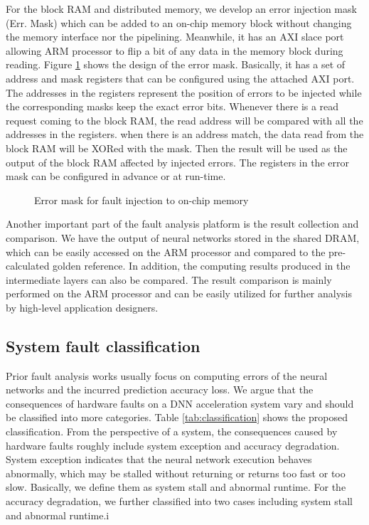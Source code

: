 For the block RAM and distributed memory, we develop an error injection 
mask (Err. Mask) which can be added to an on-chip memory block without 
changing the memory interface nor the pipelining. Meanwhile, it has an 
AXI slace port allowing ARM processor to flip a bit of any data in the 
memory block during reading. Figure \ref{fig:error-mask} shows the design 
of the error mask. Basically, it has a set of address and mask registers 
that can be configured using the attached AXI port. The addresses in 
the registers represent the position of errors to be injected while 
the corresponding masks keep the exact error bits. Whenever there is 
a read request coming to the block RAM, the read address will be compared 
with all the addresses in the registers. when there is an address match, 
the data read from the block RAM will be XORed with the mask.
Then the result will be used as the output of the block RAM 
affected by injected errors. The registers in the error mask 
can be configured in advance or at run-time. 

\begin{figure}
    \caption{Error mask for fault injection to on-chip memory}
\vspace{-0.5em}
\label{fig:error-mask}
\end{figure}

Another important part of the fault analysis platform is the result 
collection and comparison. We have the output of neural networks 
stored in the shared DRAM, which can be easily accessed on the ARM processor 
and compared to the pre-calculated golden reference. In addition, the computing 
results produced in the intermediate layers can also be compared.
The result comparison is mainly performed on the ARM processor and can be 
easily utilized for further analysis by high-level application designers.

\subsection{System fault classification}
Prior fault analysis works usually focus on computing errors of the neural networks 
and the incurred prediction accuracy loss. We argue that the consequences 
of hardware faults on a DNN acceleration system vary and should be classified 
into more categories. Table \ref{tab:classification} shows the proposed classification.
From the perspective of a system, the consequences caused by hardware faults 
roughly include system exception and accuracy degradation. System exception 
indicates that the neural network execution behaves abnormally, 
which may be stalled without returning or returns too fast or too slow.
Basically, we define them as system stall and abnormal runtime.
For the accuracy degradation, we
further classified into two cases including system stall 
and abnormal runtime.i

